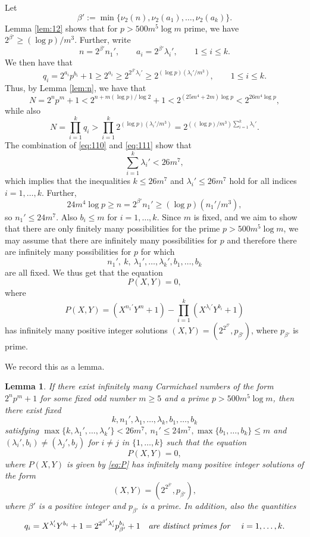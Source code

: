 \documentclass[11pt]{article}
\newtheorem{lemma}[lem]{Lemma}
\begin{document}
Let 
$$
\beta':=\min\{\nu_2(n),\nu_2(a_1),\ldots,\nu_2(a_k)\}.
$$
Lemma \ref{lem:12} shows that for $p>500m^5\log m$ prime, we have $2^{\beta'}\ge (\log p)/m^3$. Further, write 
$$
n=2^{\beta'}n_1',\qquad a_i=2^{\beta'}\lambda_i',\qquad 1\le i\le k.
$$
We then have that 
$$
q_i=2^{a_i}p^{b_i}+1\ge 2^{a_i}\ge 2^{2^{\beta'}\lambda_i'}\ge 2^{(\log p)(\lambda_i'/m^3)},\qquad 1\le i\le k.
$$
Thus,  by Lemma \ref{lem:n}, we have that 
\begin{equation}
\label{eq:110}
N=2^np^m+1<2^{n+m(\log p)/\log 2}+1<2^{(25m^4+2m)\log p}<2^{26m^4\log p},
\end{equation}
while also 
\begin{equation}
\label{eq:111}
N=\prod_{i=1}^k q_i>\prod_{i=1}^k 2^{(\log p)(\lambda_i'/m^3)}=2^{((\log p)/m^3)\sum_{i=1}^k \lambda_i'}.
\end{equation}
The combination of \eqref{eq:110} and \eqref{eq:111} show that 
$$
\sum_{i=1}^k\lambda_i'<26m^7,
$$
which implies that the inequalities $k\le 26m^7$ and $\lambda_i'\le 26m^7$ hold for all indices $i=1,\ldots,k$. Further, 
$$
24m^4\log p\ge n=2^{\beta'} n_1'\ge (\log p)(n_1'/m^3),
$$
so  $n_1'\le 24m^7$. Also $b_i\le m$ for $i=1,\ldots,k$. Since $m$ is fixed, and we aim to show that there are only finitely many possibilities for the prime $p>500m^5\log m$, we may assume that there are infinitely many possibilities for $p$ and therefore there are infinitely many possibilities for $p$ for which 
$$
n_1',~k,~\lambda_1',\ldots,\lambda_k',b_1,\ldots,b_k
$$ 
are all fixed. We thus get that the equation 
$$
P(X,Y)=0,
$$
where 
\begin{equation}
\label{eq:P}
P(X,Y)=(X^{n_1'}Y^m+1)-\prod_{i=1}^k (X^{\lambda_i'}Y^{b_i}+1)
\end{equation}
has infinitely many positive integer solutions $(X,Y)=(2^{2^{\beta'}},p_{\beta'})$, where $p_{\beta'}$ is prime.  


We record this as a lemma. 

\begin{lemma}
\label{lem:CZ}
If there exist infinitely many Carmichael numbers of the form $2^np^m+1$ for some fixed odd number $m\ge 5$ and a prime $p>500m^5\log m$, then there exist fixed 
$$
k,n_1',\lambda_1,\ldots,\lambda_k,b_1,\ldots,b_k
$$
satisfying $\max\{k,\lambda_1',\ldots,\lambda_k'\} <26m^7,~n_1'\le 24m^7, \max\{b_1,\ldots,b_k\}\le m$ and $(\lambda_i',b_i)\ne (\lambda_j',b_j)$ 
for $i\ne j$ in $\{1,\ldots,k\}$ such that the equation
$$
P(X,Y)=0,
$$
where $P(X,Y)$ is given by \eqref{eq:P} has infinitely many positive integer solutions of the form 
$$
(X,Y)=(2^{2^{\beta'}},p_{\beta'}),
$$ 
where $\beta'$ is a positive integer and $p_{\beta'}$ is a prime. 
In addition, also the quantities 
$$
q_i=X^{\lambda_i'}Y^{b_i}+1=2^{2^{\beta'}\lambda_i'}p_{\beta'}^{b_i}+1\quad {\text{\it are distinct primes for }}\quad i=1,\ldots,k.
$$  
\end{lemma}
\end{document}
